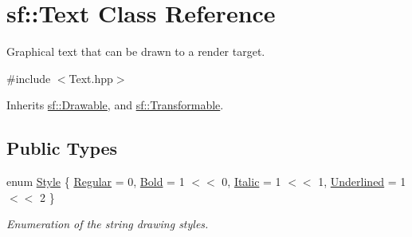\hypertarget{classsf_1_1_text}{\section{sf\+:\+:Text Class Reference}
\label{classsf_1_1_text}
}


Graphical text that can be drawn to a render target.  




{\ttfamily \#include $<$Text.\+hpp$>$}



Inherits \hyperlink{classsf_1_1_drawable}{sf\+::\+Drawable}, and \hyperlink{classsf_1_1_transformable}{sf\+::\+Transformable}.

\subsection*{Public Types}
\begin{DoxyCompactItemize}
\item 
enum \hyperlink{classsf_1_1_text_aa8add4aef484c6e6b20faff07452bd82}{Style} \{ \hyperlink{classsf_1_1_text_aa8add4aef484c6e6b20faff07452bd82a2af9ae5e1cda126570f744448e0caa32}{Regular} = 0, 
\hyperlink{classsf_1_1_text_aa8add4aef484c6e6b20faff07452bd82af1b47f98fb1e10509ba930a596987171}{Bold} = 1 $<$$<$ 0, 
\hyperlink{classsf_1_1_text_aa8add4aef484c6e6b20faff07452bd82aee249eb803848723c542c2062ebe69d8}{Italic} = 1 $<$$<$ 1, 
\hyperlink{classsf_1_1_text_aa8add4aef484c6e6b20faff07452bd82a664bd143f92b6e8c709d7f788e8b20df}{Underlined} = 1 $<$$<$ 2
 \}
\begin{DoxyCompactList}\small\item\em Enumeration of the string drawing styles. \end{DoxyCompactList}\end{DoxyCompactItemize}
